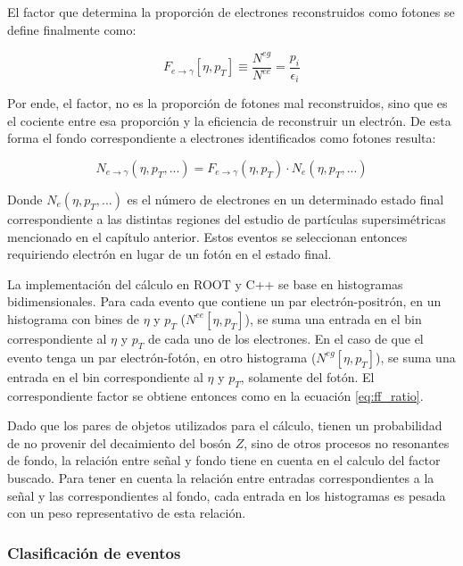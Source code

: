 El factor que determina la proporción de electrones reconstruidos como fotones se define finalmente como:

\begin{equation}
F_{e\rightarrow\gamma}[\eta , p_{T}]\equiv\frac{N^{eg}}{N^{ee}}=\frac{p_{i}}{\epsilon_{i}}
\end{equation}

Por ende, el factor, no es la proporción de fotones mal reconstruidos, sino que es el cociente entre esa proporción y la eficiencia de reconstruir un electrón. De esta forma el fondo correspondiente a electrones identificados como fotones resulta:

\begin{equation}
N_{e\rightarrow\gamma}(\eta , p_{T} , ... ) = F_{e\rightarrow\gamma}(\eta , p_{T})\cdot N_{e}(\eta , p_{T} , ...)
\end{equation}
	
Donde $N_{e}(\eta , p_{T} , ...)$ es el número de electrones en un determinado estado final correspondiente a las distintas regiones del estudio de partículas supersimétricas mencionado en el capítulo anterior. Estos eventos se seleccionan entonces requiriendo electrón en lugar de un fotón en el estado final. 

La implementación del cálculo en ROOT y C++ se  base en histogramas bidimensionales. Para cada evento que contiene un par electrón-positrón, en un histograma con bines de $\eta$ y $p_{T}$ ($N^{ee}[\eta , p_{T}]$), se suma una entrada en el bin correspondiente al $\eta$ y $p_{T}$ de cada uno de los electrones. En el caso de que el evento tenga un par electrón-fotón, en otro histograma ($N^{eg}[\eta , p_{T}]$), se suma una entrada en el bin correspondiente al $\eta$ y $p_{T}$, solamente del fotón. El correspondiente factor se obtiene entonces como en la ecuación \ref{eq:ff_ratio}.

Dado que los pares de objetos utilizados para el cálculo, tienen un probabilidad de no provenir del decaimiento del bosón $Z$, sino de otros procesos no resonantes de fondo, la relación entre señal y fondo tiene en cuenta en el calculo del factor buscado.
Para tener en cuenta la relación entre entradas correspondientes a la señal y las correspondientes al fondo, cada entrada en los histogramas es pesada con un peso representativo de esta relación.


\subsubsection{Clasificación de eventos}

